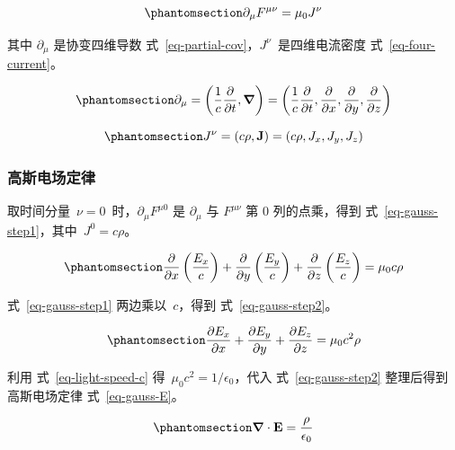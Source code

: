 \documentclass[
  chinese,
  a4paper,
  UTF8,
  12pt,
  oneside,
  openany]{ctexbook}
\theoremstyle{plain}
\theoremstyle{plain}
\theoremstyle{plain}
\theoremstyle{definition}
\theoremstyle{plain}
\theoremstyle{plain}
\theoremstyle{remark}
\begin{document}
\begin{equation}\protect\phantomsection\label{eq-maxwell-inhomo}{
\partial_{\mu}F^{\mu\nu} = \mu_{0}J^\nu
}\end{equation}

其中 \(\partial_{\mu}\) 是协变四维导数
式~\ref{eq-partial-cov}，\(J^\nu\)~是四维电流密度
式~\ref{eq-four-current}。

\begin{equation}\protect\phantomsection\label{eq-partial-cov}{
\partial_{\mu} = \left(\frac{1}{c}\frac{\partial}{\partial t},\boldsymbol{\nabla} \right) = \left(\frac{1}{c}\frac{\partial}{\partial t},\frac{\partial}{\partial x},\frac{\partial}{\partial y},\frac{\partial}{\partial z} \right)
}\end{equation}

\begin{equation}\protect\phantomsection\label{eq-four-current}{
J^\nu = (c\rho, \mathbf{J}) = (c\rho, J_x, J_y, J_z)
}\end{equation}

\subsubsection{高斯电场定律}\label{ux9ad8ux65afux7535ux573aux5b9aux5f8b}

取时间分量~\(\nu = 0\)~时，\(\partial_{\mu}F^{\mu 0}\) 是
\(\partial_{\mu}\) 与 \(F^{\mu\nu}\) 第 0 列的点乘，得到
式~\ref{eq-gauss-step1}，其中~\(J^{0} = c\rho\)。

\begin{equation}\protect\phantomsection\label{eq-gauss-step1}{
\frac{\partial}{\partial x}\left(\frac{E_x}{c} \right) + \frac{\partial}{\partial y}\left(\frac{E_y}{c} \right) + \frac{\partial}{\partial z}\left(\frac{E_z}{c} \right) = \mu_{0}c\rho
}\end{equation}

式~\ref{eq-gauss-step1} 两边乘以~\(c\)，得到 式~\ref{eq-gauss-step2}。

\begin{equation}\protect\phantomsection\label{eq-gauss-step2}{
\frac{\partial E_x}{\partial x} + \frac{\partial E_y}{\partial y} + \frac{\partial E_z}{\partial z} = \mu_{0}c^{2}\rho
}\end{equation}

利用 式~\ref{eq-light-speed-c}
得~\(\mu_{0}c^{2} = 1/\epsilon_{0}\)，代入 式~\ref{eq-gauss-step2}
整理后得到高斯电场定律 式~\ref{eq-gauss-E}。

\begin{equation}\protect\phantomsection\label{eq-gauss-E}{
\boldsymbol{\nabla} \cdot \mathbf{E} = \frac{\rho}{\epsilon_{0}}
}\end{equation}
\end{document}
